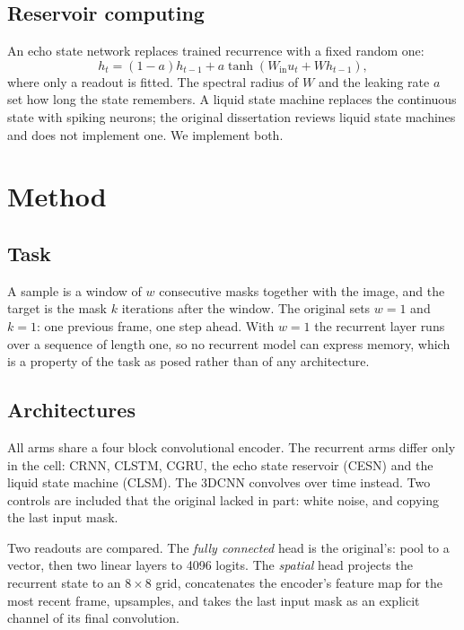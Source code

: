\documentclass[11pt,a4paper]{article}
\begin{document}
\subsection{Reservoir computing}

An echo state network replaces trained recurrence with a fixed random one:
\begin{equation}
h_t = (1-a) h_{t-1} + a \tanh(W_{\text{in}} u_t + W h_{t-1}),
\end{equation}
where only a readout is fitted. The spectral radius of $W$ and the leaking rate
$a$ set how long the state remembers. A liquid state machine replaces the
continuous state with spiking neurons; the original dissertation reviews liquid
state machines and does not implement one. We implement both.

\section{Method}

\subsection{Task}

A sample is a window of $w$ consecutive masks together with the image, and the
target is the mask $k$ iterations after the window. The original sets $w=1$ and
$k=1$: one previous frame, one step ahead. With $w=1$ the recurrent layer runs
over a sequence of length one, so no recurrent model can express memory,
which is a property of the task as posed rather than of any architecture.

\subsection{Architectures}

All arms share a four block convolutional encoder. The recurrent arms differ
only in the cell: CRNN, CLSTM, CGRU, the echo state reservoir (CESN) and the
liquid state machine (CLSM). The 3DCNN convolves over time instead. Two
controls are included that the original lacked in part: white noise, and
copying the last input mask.

Two readouts are compared. The \emph{fully connected} head is the original's:
pool to a vector, then two linear layers to 4096 logits. The \emph{spatial}
head projects the recurrent state to an $8 \times 8$ grid, concatenates the
encoder's feature map for the most recent frame, upsamples, and takes the last
input mask as an explicit channel of its final convolution.
\end{document}
